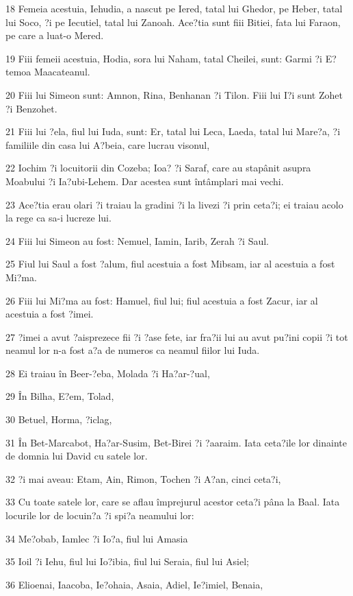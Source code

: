 \par 18 Femeia acestuia, Iehudia, a nascut pe Iered, tatal lui Ghedor, pe Heber, tatal lui Soco, ?i pe Iecutiel, tatal lui Zanoah. Ace?tia sunt fiii Bitiei, fata lui Faraon, pe care a luat-o Mered.
\par 19 Fiii femeii acestuia, Hodia, sora lui Naham, tatal Cheilei, sunt: Garmi ?i E?temoa Maacateanul.
\par 20 Fiii lui Simeon sunt: Amnon, Rina, Benhanan ?i Tilon. Fiii lui I?i sunt Zohet ?i Benzohet.
\par 21 Fiii lui ?ela, fiul lui Iuda, sunt: Er, tatal lui Leca, Laeda, tatal lui Mare?a, ?i familiile din casa lui A?beia, care lucrau visonul,
\par 22 Iochim ?i locuitorii din Cozeba; Ioa? ?i Saraf, care au stapânit asupra Moabului ?i Ia?ubi-Lehem. Dar acestea sunt întâmplari mai vechi.
\par 23 Ace?tia erau olari ?i traiau la gradini ?i la livezi ?i prin ceta?i; ei traiau acolo la rege ca sa-i lucreze lui.
\par 24 Fiii lui Simeon au fost: Nemuel, Iamin, Iarib, Zerah ?i Saul.
\par 25 Fiul lui Saul a fost ?alum, fiul acestuia a fost Mibsam, iar al acestuia a fost Mi?ma.
\par 26 Fiii lui Mi?ma au fost: Hamuel, fiul lui; fiul acestuia a fost Zacur, iar al acestuia a fost ?imei.
\par 27 ?imei a avut ?aisprezece fii ?i ?ase fete, iar fra?ii lui au avut pu?ini copii ?i tot neamul lor n-a fost a?a de numeros ca neamul fiilor lui Iuda.
\par 28 Ei traiau în Beer-?eba, Molada ?i Ha?ar-?ual,
\par 29 În Bilha, E?em, Tolad,
\par 30 Betuel, Horma, ?iclag,
\par 31 În Bet-Marcabot, Ha?ar-Susim, Bet-Birei ?i ?aaraim. Iata ceta?ile lor dinainte de domnia lui David cu satele lor.
\par 32 ?i mai aveau: Etam, Ain, Rimon, Tochen ?i A?an, cinci ceta?i,
\par 33 Cu toate satele lor, care se aflau împrejurul acestor ceta?i pâna la Baal. Iata locurile lor de locuin?a ?i spi?a neamului lor:
\par 34 Me?obab, Iamlec ?i Io?a, fiul lui Amasia
\par 35 Ioil ?i Iehu, fiul lui Io?ibia, fiul lui Seraia, fiul lui Asiel;
\par 36 Elioenai, Iaacoba, Ie?ohaia, Asaia, Adiel, Ie?imiel, Benaia,
